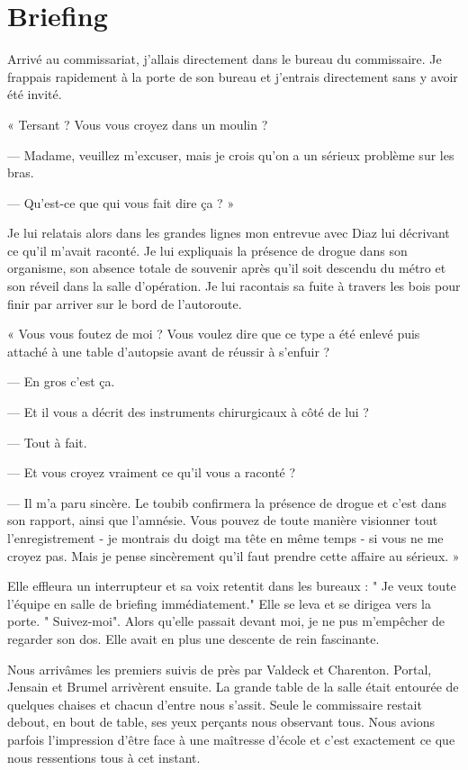 \chapter{Briefing}

Arrivé au commissariat, j'allais directement dans le bureau du commissaire. Je frappais rapidement à la porte de son
bureau et j'entrais directement sans y avoir été invité.

« Tersant ? Vous vous croyez dans un moulin ?

— Madame, veuillez m'excuser, mais je crois qu'on a un sérieux problème sur les bras.

— Qu'est-ce que qui vous fait dire ça ? »

Je lui relatais alors dans les grandes lignes mon  entrevue avec Diaz lui décrivant ce qu'il m'avait raconté. Je lui
expliquais la présence de drogue dans son organisme, son absence totale de souvenir après qu'il soit descendu du
métro et son réveil dans la salle d'opération. Je lui racontais sa fuite à travers les bois pour finir par arriver 
sur le bord de l'autoroute.

« Vous vous foutez de moi ? Vous voulez dire que ce type a été enlevé puis attaché à une table d'autopsie avant de
réussir à s'enfuir ?

— En gros c'est ça.

— Et il vous a décrit des instruments chirurgicaux à côté de lui ?

— Tout à fait.

— Et vous croyez vraiment ce qu'il vous a raconté ?

— Il m'a paru sincère. Le toubib confirmera la présence de drogue et c'est dans son rapport, ainsi que l'amnésie. Vous
pouvez de toute manière visionner tout l'enregistrement - je montrais du doigt ma tête en même temps - si vous ne me
croyez pas. Mais je pense sincèrement qu'il faut prendre cette affaire au sérieux. »

Elle effleura un interrupteur et sa voix retentit dans les bureaux : " Je veux toute l'équipe en salle de briefing
immédiatement." Elle se leva et se dirigea vers la porte. " Suivez-moi". Alors qu'elle passait devant moi, je ne pus
m'empêcher de regarder son dos. Elle avait en plus une descente de rein fascinante. 

Nous arrivâmes les premiers suivis de près par Valdeck et Charenton. Portal, Jensain et Brumel arrivèrent ensuite. La
grande table de la salle était entourée de quelques chaises et chacun d'entre nous s'assit. Seule le commissaire
restait debout, en bout de table, ses yeux perçants nous observant tous. Nous avions parfois l'impression d'être face
à une maîtresse d'école et c'est exactement ce que nous ressentions tous à cet instant.

